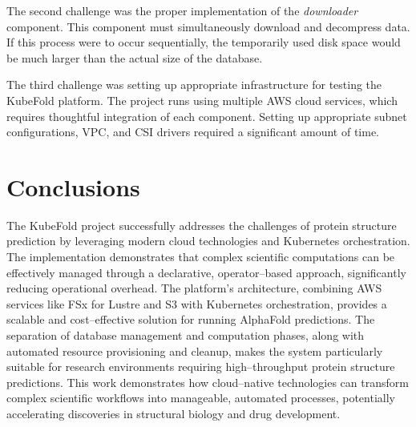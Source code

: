 The second challenge was the proper implementation of the \textit{downloader} component.
This component must simultaneously download and decompress data.
If this process were to occur sequentially, the temporarily used disk space would be much larger than the actual size of the database.

The third challenge was setting up appropriate infrastructure for testing the KubeFold platform.
The project runs using multiple AWS cloud services, which requires thoughtful integration of each component.
Setting up appropriate subnet configurations, VPC, and CSI drivers required a significant amount of time.

\section{Conclusions}

The KubeFold project successfully addresses the challenges of protein structure prediction by leveraging modern cloud technologies and Kubernetes orchestration.
The implementation demonstrates that complex scientific computations can be effectively managed through a declarative, operator--based approach, significantly reducing operational overhead.
The platform's architecture, combining AWS services like FSx for Lustre and S3 with Kubernetes orchestration, provides a scalable and cost--effective solution for running AlphaFold predictions.
The separation of database management and computation phases, along with automated resource provisioning and cleanup, makes the system particularly suitable for research environments requiring high--throughput protein structure predictions.
This work demonstrates how cloud--native technologies can transform complex scientific workflows into manageable, automated processes, potentially accelerating discoveries in structural biology and drug development.